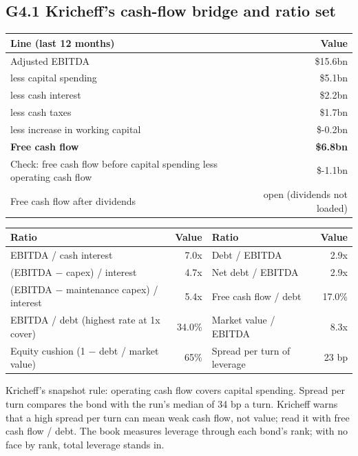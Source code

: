 \documentclass[11pt,a4paper]{article}
\begin{document}
\subsection*{G4.1 Kricheff's cash-flow bridge and ratio set}
\begin{center}\footnotesize\setlength{\tabcolsep}{3.5pt}\begin{tabular}{@{}lr@{}}\toprule
Line (last 12 months) & Value \\\midrule
Adjusted EBITDA & \$15.6bn \\
less capital spending & \$5.1bn \\
less cash interest & \$2.2bn \\
less cash taxes & \$1.7bn \\
less increase in working capital & \$-0.2bn \\
\textbf{Free cash flow} & \textbf{\$6.8bn} \\
Check: free cash flow before capital spending less operating cash flow & \$-1.1bn \\
Free cash flow after dividends & open (dividends not loaded) \\
\bottomrule\end{tabular}\end{center}
\begin{center}\footnotesize\setlength{\tabcolsep}{3.5pt}\begin{tabular}{@{}lrlr@{}}\toprule
Ratio & Value & Ratio & Value \\\midrule
EBITDA / cash interest & 7.0x & Debt / EBITDA & 2.9x \\
(EBITDA $-$ capex) / interest & 4.7x & Net debt / EBITDA & 2.9x \\
(EBITDA $-$ maintenance capex) / interest & 5.4x & Free cash flow / debt & 17.0\% \\
EBITDA / debt (highest rate at 1x cover) & 34.0\% & Market value / EBITDA & 8.3x \\
Equity cushion (1 $-$ debt / market value) & 65\% & Spread per turn of leverage & 23 bp \\
\bottomrule\end{tabular}\end{center}
Kricheff's snapshot rule: operating cash flow covers capital spending. Spread per turn compares the bond with the run's median of 34 bp a turn. Kricheff warns that a high spread per turn can mean weak cash flow, not value; read it with free cash flow / debt. The book measures leverage through each bond's rank; with no face by rank, total leverage stands in.
\end{document}
